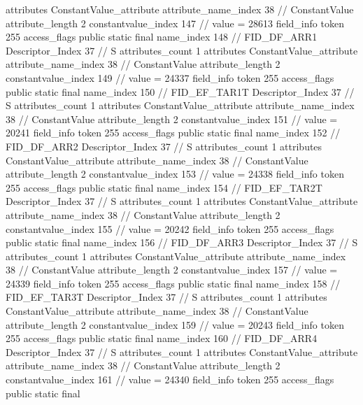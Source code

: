 {{{{{				attributes {
				ConstantValue_attribute {
					attribute_name_index	38		// ConstantValue
					attribute_length	2
					constantvalue_index	147		// value = 28613
				}
				}
			}
			field_info {
				token	255
				access_flags	public static final
				name_index	148		// FID_DF_ARR1
				Descriptor_Index	37		// S
				attributes_count	1
				attributes {
				ConstantValue_attribute {
					attribute_name_index	38		// ConstantValue
					attribute_length	2
					constantvalue_index	149		// value = 24337
				}
				}
			}
			field_info {
				token	255
				access_flags	public static final
				name_index	150		// FID_EF_TAR1T
				Descriptor_Index	37		// S
				attributes_count	1
				attributes {
				ConstantValue_attribute {
					attribute_name_index	38		// ConstantValue
					attribute_length	2
					constantvalue_index	151		// value = 20241
				}
				}
			}
			field_info {
				token	255
				access_flags	public static final
				name_index	152		// FID_DF_ARR2
				Descriptor_Index	37		// S
				attributes_count	1
				attributes {
				ConstantValue_attribute {
					attribute_name_index	38		// ConstantValue
					attribute_length	2
					constantvalue_index	153		// value = 24338
				}
				}
			}
			field_info {
				token	255
				access_flags	public static final
				name_index	154		// FID_EF_TAR2T
				Descriptor_Index	37		// S
				attributes_count	1
				attributes {
				ConstantValue_attribute {
					attribute_name_index	38		// ConstantValue
					attribute_length	2
					constantvalue_index	155		// value = 20242
				}
				}
			}
			field_info {
				token	255
				access_flags	public static final
				name_index	156		// FID_DF_ARR3
				Descriptor_Index	37		// S
				attributes_count	1
				attributes {
				ConstantValue_attribute {
					attribute_name_index	38		// ConstantValue
					attribute_length	2
					constantvalue_index	157		// value = 24339
				}
				}
			}
			field_info {
				token	255
				access_flags	public static final
				name_index	158		// FID_EF_TAR3T
				Descriptor_Index	37		// S
				attributes_count	1
				attributes {
				ConstantValue_attribute {
					attribute_name_index	38		// ConstantValue
					attribute_length	2
					constantvalue_index	159		// value = 20243
				}
				}
			}
			field_info {
				token	255
				access_flags	public static final
				name_index	160		// FID_DF_ARR4
				Descriptor_Index	37		// S
				attributes_count	1
				attributes {
				ConstantValue_attribute {
					attribute_name_index	38		// ConstantValue
					attribute_length	2
					constantvalue_index	161		// value = 24340
				}
				}
			}
			field_info {
				token	255
				access_flags	public static final
}}}}}
